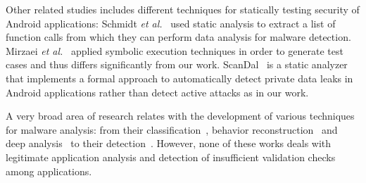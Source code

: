 Other related studies includes different techniques for statically testing 
security of Android applications: Schmidt \emph{et al.}~\cite{schmidt2009static} used static analysis to extract a 
list of function calls from which they can perform data analysis for malware 
detection. Mirzaei \emph{et al.}~\cite{mirzaei2012testing} applied symbolic execution techniques in order to generate test cases and thus differs significantly from our work. ScanDal~\cite{kim2012scandal} is a static analyzer that implements a formal approach to automatically detect private data leaks in Android applications rather than detect active attacks as in our work. 

A very broad area of research relates with the development of various techniques for malware analysis: from their classification~\cite{zhou2012dissecting}, 
behavior reconstruction~\cite{reina2013system} and deep analysis~\cite{yan2012droidscope} to their detection~\cite{burguera2011crowdroid, grace2012riskranker}. However, none of these works deals with legitimate application analysis and detection of insufficient validation checks among applications.


